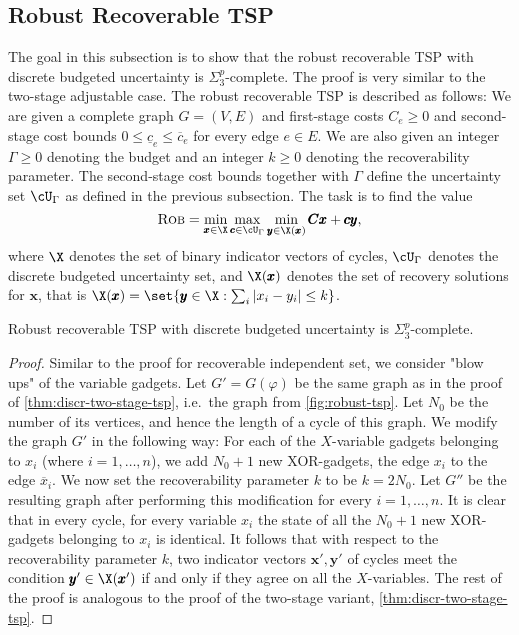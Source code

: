 \documentclass[a4paper,abstracton]{scrartcl}
\begin{document}
\subsection{Robust Recoverable TSP}
\label{subsec:rec-tsp}

The goal in this subsection is to show that the robust recoverable TSP with discrete budgeted uncertainty is $\Sigma_3^p$-complete. 
The proof is very similar to the two-stage adjustable case. 
The robust recoverable TSP is described as follows: 
We are given a complete graph $G = (V,E)$ and first-stage costs $C_e \geq 0$ and second-stage cost bounds $0 \leq \underline{c}_e \leq \overline{c}_e$ for every edge $e \in E$. 
We are also given an integer $\Gamma \geq 0$ denoting the budget and an integer $k \geq 0$ denoting the recoverability parameter. 
The second-stage cost bounds together with $\Gamma$ define the uncertainty set $\cU_\Gamma$ as defined in the previous subsection.
The task is to find the value 
\begin{equation}
 \textsc{Rob} = \min_{\pmb x  \in \X} \max_{\pmb c \in \cU_\Gamma } \min_{\pmb y \in \X(\pmb x) } \pmb C \pmb x + \pmb c \pmb y, \label{eq:recoverable-tsp}
 \end{equation}
where $\X$ denotes the set of binary indicator vectors of  cycles, $\cU_\Gamma$ denotes the discrete budgeted uncertainty set, and $\X(\pmb x)$ denotes the set of recovery solutions for $\pmb x$, that is $\X(\pmb x) = \set{\pmb y \in \X : \sum_i |x_i - y_i| \leq k}$.


\begin{theorem}
\label{thm:recoverable-tsp}
Robust recoverable TSP with discrete budgeted uncertainty is $\Sigma_3^p$-complete.
\end{theorem}

\begin{proof}
Similar to the proof for recoverable independent set, we consider "blow ups" of the variable gadgets. 
Let $G' = G(\varphi)$ be the same graph as in the proof of \cref{thm:discr-two-stage-tsp}, i.e.\ the graph from \cref{fig:robust-tsp}. 
Let $N_0$ be the number of its vertices, and hence the length of a  cycle of this graph. We modify the graph $G'$ in the following way:
For each of the $X$-variable gadgets belonging to $x_i$ (where $i = 1,\dots,n$), we add $N_0 + 1$ new XOR-gadgets,  the edge $x_i$ to the edge $\overline x_i$.
We now set the recoverability parameter $k$ to be $k = 2N_0$. Let $G''$ be the resulting graph after performing this modification for every $i=1,\dots,n$.  
It is clear that in every  cycle, for every variable $x_i$ the state of all the $N_0 + 1$ new XOR-gadgets belonging to $x_i$ is identical.
It follows that with respect to the recoverability parameter $k$, two indicator vectors $\pmb x', \pmb y'$ of  cycles meet the condition $\pmb y' \in \X(\pmb x')$ if and only if they agree on all the $X$-variables.
The rest of the proof is analogous to the proof of the two-stage variant,  \cref{thm:discr-two-stage-tsp}.
\end{proof}
\end{document}
